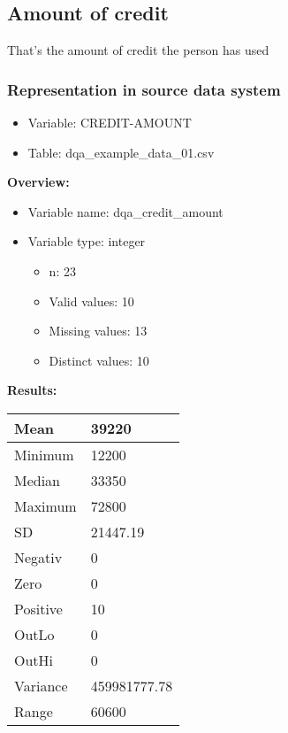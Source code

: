 \documentclass[
]{article}
\providecommand{\tightlist}{%
  \setlength{\itemsep}{0pt}\setlength{\parskip}{0pt}}
\begin{document}
\newpage

\hypertarget{amount-of-credit}{%
\subsection{Amount of credit}\label{amount-of-credit}}

That's the amount of credit the person has used

\hypertarget{representation-in-source-data-system-1}{%
\subsubsection{\texorpdfstring{Representation in \textbf{source} data
system}{Representation in source data system}}\label{representation-in-source-data-system-1}}

\begin{itemize}
\tightlist
\item
  Variable: CREDIT-AMOUNT
\item
  Table: dqa\_example\_data\_01.csv
\end{itemize}

\textbf{Overview:}

\begin{itemize}
\tightlist
\item
  Variable name: dqa\_credit\_amount
\item
  Variable type: integer

  \begin{itemize}
  \tightlist
  \item
    n: 23
  \item
    Valid values: 10
  \item
    Missing values: 13
  \item
    Distinct values: 10
  \end{itemize}
\end{itemize}

\textbf{Results:}\\

\begin{table}[H]
\centering
\begin{tabular}{l|l}
\hline
Mean & 39220\\
\hline
Minimum & 12200\\
\hline
Median & 33350\\
\hline
Maximum & 72800\\
\hline
SD & 21447.19\\
\hline
Negativ & 0\\
\hline
Zero & 0\\
\hline
Positive & 10\\
\hline
OutLo & 0\\
\hline
OutHi & 0\\
\hline
Variance & 459981777.78\\
\hline
Range & 60600\\
\hline
\end{tabular}
\end{table}
\end{document}
